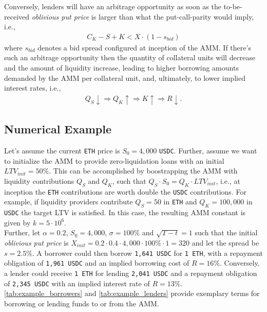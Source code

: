 \documentclass[a4paper]{article}
\begin{document}
Conversely, lenders will have an arbitrage opportunity as soon as the to-be-received \emph{oblivious put price} is larger than what the put-call-parity would imply, i.e.,
\begin{equation}
\label{eq:option_premium_lenders}
\begin{split}
C_K - S + K < X \cdot (1-s_{bid})
\end{split}
\end{equation}
where $s_{bid}$ denotes a bid spread configured at inception of the AMM. If there's such an arbitrage opportunity then the quantity of collateral units will decrease and the amount of liquidity increase, leading to higher borrowing amounts demanded by the AMM per collateral unit, and, ultimately, to lower implied interest rates, i.e.,
\begin{equation}
\begin{split}
Q_S\downarrow \Rightarrow Q_K\uparrow \Rightarrow K\uparrow \Rightarrow R\downarrow.
\end{split}
\end{equation}

\subsection{Numerical Example}
Let's assume the current \verb|ETH| price is $S_0=4,000$ \verb|USDC|. Further, assume we want to initialize the AMM to provide zero-liquidation loans with an initial $LTV_{init}=50\%$. This can be accomplished by boostrapping the AMM with liquidity contributions $Q_S$ and $Q_K$, such that $Q_S \cdot S_0 = Q_K \cdot LTV_{init}$, i.e., at inception the \verb|ETH| contributions are worth double the \verb|USDC| contributions. For example, if liquidity providers contribute $Q_S=50$ in \verb|ETH| and $Q_K=100,000$ in \verb|USDC| the target LTV is satisfied. In this case, the resulting AMM constant is given by $k=5\cdot10^6$.\\

Further, let $\alpha=0.2$, $S_0=4,000$, $\sigma=100\%$ and $\sqrt{T-t}=1$ such that the initial \emph{oblivious put price} is $X_{init} = 0.2 \cdot 0.4 \cdot 4,000 \cdot 100\% \cdot 1 = 320$ and let the spread be $s=2.5\%$. A borrower could then borrow \verb|1,641 USDC| for \verb|1 ETH|, with a repayment obligation of \verb|1,961 USDC| and an implied borrowing cost of $R=16\%$. Conversely, a lender could receive \verb|1 ETH| for lending \verb|2,041 USDC| and a repayment obligation of \verb|2,345 USDC| with an implied interest rate of $R=13\%$. \cref{tab:example_borrowers} and \cref{tab:example_lenders} provide exemplary terms for borrowing or lending funds to or from the AMM.
\end{document}
